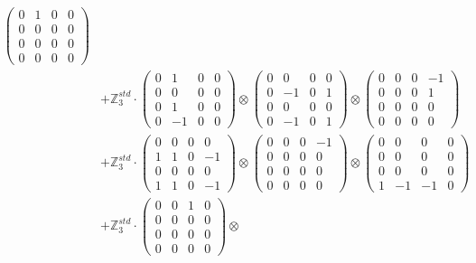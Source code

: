 \documentclass{article}
\begin{document}
{\begin{align}
            \begin{pmatrix} 0 & 1 & 0 & 0 \\ 0 & 0 & 0 & 0 \\ 0 & 0 & 0 & 0 \\ 0 & 0 & 0 & 0 \end{pmatrix} \\ 
        &+ \label{Rs16-Rc11-Solution-24-c25} \mathbb{Z}_3^{std} \cdot 
            \begin{pmatrix} 0 & 1 & 0 & 0 \\ 0 & 0 & 0 & 0 \\ 0 & 1 & 0 & 0 \\ 0 & -1 & 0 & 0 \end{pmatrix} \otimes 
            \begin{pmatrix} 0 & 0 & 0 & 0 \\ 0 & -1 & 0 & 1 \\ 0 & 0 & 0 & 0 \\ 0 & -1 & 0 & 1 \end{pmatrix} \otimes 
            \begin{pmatrix} 0 & 0 & 0 & -1 \\ 0 & 0 & 0 & 1 \\ 0 & 0 & 0 & 0 \\ 0 & 0 & 0 & 0 \end{pmatrix} \\ 
        &+ \label{Rs16-Rc11-Solution-24-c26} \mathbb{Z}_3^{std} \cdot 
            \begin{pmatrix} 0 & 0 & 0 & 0 \\ 1 & 1 & 0 & -1 \\ 0 & 0 & 0 & 0 \\ 1 & 1 & 0 & -1 \end{pmatrix} \otimes 
            \begin{pmatrix} 0 & 0 & 0 & -1 \\ 0 & 0 & 0 & 0 \\ 0 & 0 & 0 & 0 \\ 0 & 0 & 0 & 0 \end{pmatrix} \otimes 
            \begin{pmatrix} 0 & 0 & 0 & 0 \\ 0 & 0 & 0 & 0 \\ 0 & 0 & 0 & 0 \\ 1 & -1 & -1 & 0 \end{pmatrix} \\ 
        &+ \label{Rs16-Rc11-Solution-24-c27} \mathbb{Z}_3^{std} \cdot 
            \begin{pmatrix} 0 & 0 & 1 & 0 \\ 0 & 0 & 0 & 0 \\ 0 & 0 & 0 & 0 \\ 0 & 0 & 0 & 0 \end{pmatrix} \otimes 

\end{align}}
\end{document}
